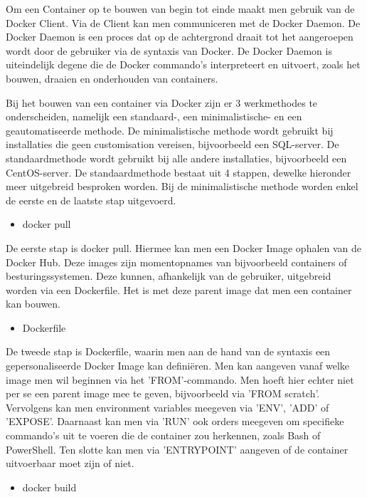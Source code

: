 Om een Container op te bouwen van begin tot einde maakt men gebruik van de Docker Client. Via de Client kan men communiceren met de Docker Daemon. De Docker Daemon is een proces dat op de achtergrond draait tot het aangeroepen wordt door de gebruiker via de syntaxis van Docker. De Docker Daemon is uiteindelijk degene die de Docker commando's interpreteert en uitvoert, zoals het bouwen, draaien en onderhouden van containers.

Bij het bouwen van een container via Docker zijn er 3 werkmethodes te onderscheiden, namelijk een standaard-, een minimalistische- en een geautomatiseerde methode. De minimalistische methode wordt gebruikt bij installaties die geen customisation vereisen, bijvoorbeeld een SQL-server. De standaardmethode wordt gebruikt bij alle andere installaties, bijvoorbeeld een CentOS-server. De standaardmethode bestaat uit 4 stappen, dewelke hieronder meer uitgebreid besproken worden. Bij de minimalistische methode worden enkel de eerste en de laatste stap uitgevoerd. \autocite{Steven2018} \autocite{Maes2017}

\begin{itemize}[noitemsep]
	\item docker pull
\end{itemize}

De eerste stap is docker pull. Hiermee kan men een Docker Image ophalen van de Docker Hub. Deze images zijn momentopnames van bijvoorbeeld containers of besturingssystemen. Deze kunnen, afhankelijk van de gebruiker, uitgebreid worden via een Dockerfile. Het is met deze parent image dat men een container kan bouwen.

\begin{itemize}[noitemsep]
	\item Dockerfile
\end{itemize}

De tweede stap is Dockerfile, waarin men aan de hand van de syntaxis een gepersonaliseerde Docker Image kan definiëren. Men kan aangeven vanaf welke image men wil beginnen via het 'FROM'-commando. Men hoeft hier echter niet per se een parent image mee te geven, bijvoorbeeld via 'FROM scratch'. Vervolgens kan men environment variables meegeven via 'ENV', 'ADD' of 'EXPOSE'. Daarnaast kan men via 'RUN' ook orders meegeven om specifieke commando's uit te voeren die de container zou herkennen, zoals Bash of PowerShell. Ten slotte kan men via 'ENTRYPOINT' aangeven of de container uitvoerbaar moet zijn of niet.

\begin{itemize}[noitemsep]
	\item docker build
\end{itemize}


